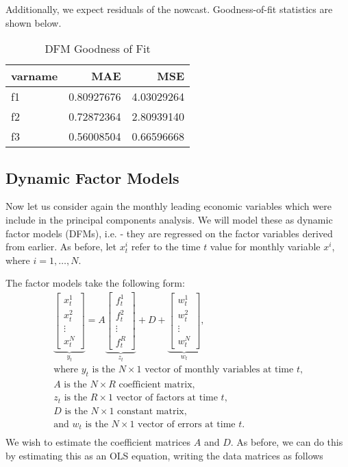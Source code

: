 \documentclass[11pt, letterpaper]{article}\usepackage[]{graphicx}\usepackage[]{color}
\begin{document}
Additionally, we expect residuals of the nowcast. Goodness-of-fit statistics are shown below.
\begin{table}[H]
\centering
\begingroup\footnotesize
\begin{tabular}{lrr}
  \hline
varname & MAE & MSE \\ 
  \hline
f1 & 0.80927676 & 4.03029264 \\ 
  f2 & 0.72872364 & 2.80939140 \\ 
  f3 & 0.56008504 & 0.66596668 \\ 
   \hline
\end{tabular}
\endgroup
\caption{DFM Goodness of Fit} 
\end{table}




\subsection{Dynamic Factor Models}
Now let us consider again the monthly leading economic variables which were include in the principal components analysis. We will model these as dynamic factor models (DFMs), i.e. - they are regressed on the factor variables derived from earlier. As before, let $x^i_t$ refer to the time $t$ value for monthly variable $x^i$, where $i = 1, \dots, N$.

The factor models take the following form:
\begin{align*}
\underbrace{\begin{bmatrix}
	x^1_t\\
	x^2_t\\
	\vdots \\
	x^N_t
\end{bmatrix}}_{y_t}
=
A
\underbrace{\begin{bmatrix}
	f^1_{t}\\
	f^2_{t}\\
	\vdots \\
	f^R_{t}
\end{bmatrix}}_{z_t}
+
D 
+
\underbrace{\begin{bmatrix}
	w^1_t\\
	w^2_t\\
	\vdots\\
	w^N_t
\end{bmatrix}}_{w_t},\\
\text{where $y_t$ is the $N \times 1$ vector of monthly variables at time $t$,}\\
\text{$A$ is the $N \times R$ coefficient matrix,}\\
\text{$z_t$ is the $R \times 1$ vector of factors at time $t$,}\\
\text{$D$ is the $N \times 1$ constant matrix,}\\
\text{and $w_t$ is the $N \times 1$ vector of errors at time $t$.}\\
\end{align*}
We wish to estimate the coefficient matrices $A$ and $D$. As before, we can do this by estimating this as an OLS equation, writing the data matrices as follows
\end{document}
